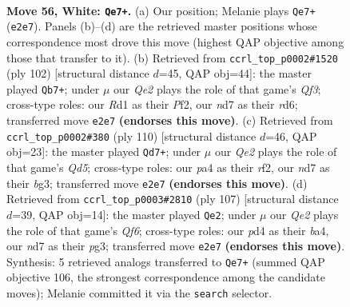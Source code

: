 \documentclass[11pt]{article}
\begin{document}
\clearpage

\begin{figure}[p]\centering
\begin{subfigure}{0.46\textwidth}\centering
\resizebox{\linewidth}{!}{%
\newchessgame
\chessboard[
  setfen={6r1/3n3k/8/1q5p/p1Np4/P7/4Q3/3R3K w - - 0 56},
  showmover=false,
  pgfstyle=straightmove, color=movearrow, markmove={e2-e7}
]}
\caption{}
\end{subfigure}\hfill
\begin{subfigure}{0.46\textwidth}\centering
\resizebox{\linewidth}{!}{%
\newchessgame
\chessboard[
  setfen={8/7k/3rqn1p/4Np2/8/5QP1/5P1K/4R3 w - - 5 52},
  showmover=false,
  pgfstyle=straightmove, color=movearrow, markmove={f3-b7}
]}
\caption{}
\end{subfigure}
\\[4pt]
\begin{subfigure}{0.46\textwidth}\centering
\resizebox{\linewidth}{!}{%
\newchessgame
\chessboard[
  setfen={8/6k1/6pp/P1PQ4/3N3P/4q1b1/5r2/6RK w - - 20 56},
  showmover=false,
  pgfstyle=straightmove, color=movearrow, markmove={d5-d7}
]}
\caption{}
\end{subfigure}\hfill
\begin{subfigure}{0.46\textwidth}\centering
\resizebox{\linewidth}{!}{%
\newchessgame
\chessboard[
  setfen={r6k/6p1/5n1p/8/B2Q4/5qP1/1P5P/1KR5 b - - 0 54},
  showmover=false,
  pgfstyle=straightmove, color=movearrow, markmove={f3-e2}
]}
\caption{}
\end{subfigure}
\caption{\textbf{Move 56, White: \texttt{Qe7+}.} (a) Our position; Melanie plays \texttt{Qe7+} (\texttt{e2e7}). Panels (b)--(d) are the retrieved master positions whose correspondence most drove this move (highest QAP objective among those that transfer to it). (b) Retrieved from \texttt{ccrl\_top\_p0002\#1520} (ply 102) [structural distance $d$=45, QAP obj=44]: the master played \texttt{Qb7+}; under $\mu$ our \emph{Qe2} plays the role of that game's \emph{Qf3}; cross-type roles: our \emph{R}d1 as their \emph{P}f2, our \emph{n}d7 as their \emph{r}d6; transferred move \texttt{e2e7} \textbf{(endorses this move)}. (c) Retrieved from \texttt{ccrl\_top\_p0002\#380} (ply 110) [structural distance $d$=46, QAP obj=23]: the master played \texttt{Qd7+}; under $\mu$ our \emph{Qe2} plays the role of that game's \emph{Qd5}; cross-type roles: our \emph{p}a4 as their \emph{r}f2, our \emph{n}d7 as their \emph{b}g3; transferred move \texttt{e2e7} \textbf{(endorses this move)}. (d) Retrieved from \texttt{ccrl\_top\_p0003\#2810} (ply 107) [structural distance $d$=39, QAP obj=14]: the master played \texttt{Qe2}; under $\mu$ our \emph{Qe2} plays the role of that game's \emph{Qf6}; cross-type roles: our \emph{p}d4 as their \emph{b}a4, our \emph{n}d7 as their \emph{p}g3; transferred move \texttt{e2e7} \textbf{(endorses this move)}. Synthesis: 5 retrieved analogs transferred to \texttt{Qe7+} (summed QAP objective 106, the strongest correspondence among the candidate moves); Melanie committed it via the \texttt{search} selector.}
\label{fig:thought-m110}
\end{figure}
\end{document}
